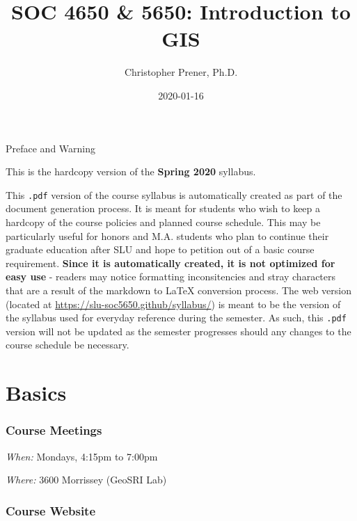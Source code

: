 \documentclass[]{book}
\title{SOC 4650 \& 5650: Introduction to GIS}
\author{Christopher Prener, Ph.D.}
\date{2020-01-16}
\begin{document}
\maketitle

\begin{center}
{\huge Preface and Warning} \\
\end{center}
\vspace{5mm}
This is the hardcopy version of the \textbf{Spring 2020} syllabus.
\vspace{5mm}
\par \noindent This \texttt{.pdf} version of the course syllabus is automatically created as part of the document generation process. It is meant for students who wish to keep a hardcopy of the course policies and planned course schedule. This may be particularly useful for honors and M.A. students who plan to continue their graduate education after SLU and hope to petition out of a basic course requirement. \textbf{Since it is automatically created, it is not optimized for easy use} - readers may notice formatting inconsitencies and stray characters that are a result of the markdown to \LaTeX{} conversion process. The web version (located at \href{https://slu-soc5650.github/syllabus/}{https://slu-soc5650.github/syllabus/}) is meant to be the version of the syllabus used for everyday reference during the semester. As such, this \texttt{.pdf} version will not be updated as the semester progresses should any changes to the course schedule be necessary.

\hypertarget{basics}{%
\chapter*{Basics}\label{basics}}

\hypertarget{course-meetings}{%
\subsection*{Course Meetings}\label{course-meetings}}

\emph{When:} Mondays, 4:15pm to 7:00pm

\emph{Where:} 3600 Morrissey (GeoSRI Lab)

\hypertarget{course-website}{%
\subsection*{Course Website}\label{course-website}}
\end{document}
